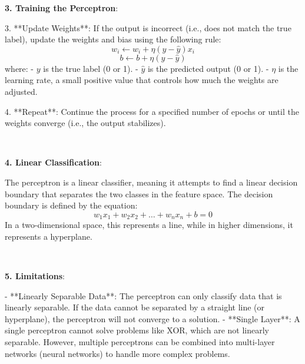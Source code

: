 \documentclass{article}
\newenvironment{cheatformula}[1][כותרת]{
    \begin{minipage}{\linewidth}
    \textbf{#1}:
}{
    \end{minipage}\\[2ex]
}
\begin{document}
\begin{multicols*}{2}
\begin{cheatformula}[3. Training the Perceptron]
3. **Update Weights**: If the output is incorrect (i.e., does not match the true label), update the weights and bias using the following rule:
   $$
   w_i \leftarrow w_i + \eta (y - \hat{y}) x_i
   $$
   $$
   b \leftarrow b + \eta (y - \hat{y})
   $$
   where:
   - $y$ is the true label (0 or 1).
   - $\hat{y}$ is the predicted output (0 or 1).
   - $\eta$ is the learning rate, a small positive value that controls how much the weights are adjusted.

4. **Repeat**: Continue the process for a specified number of epochs or until the weights converge (i.e., the output stabilizes).
\end{cheatformula}

\begin{cheatformula}[4. Linear Classification]
The perceptron is a linear classifier, meaning it attempts to find a linear decision boundary that separates the two classes in the feature space. The decision boundary is defined by the equation:
$$
w_1x_1 + w_2x_2 + \ldots + w_nx_n + b = 0
$$
In a two-dimensional space, this represents a line, while in higher dimensions, it represents a hyperplane.
\end{cheatformula}

\begin{cheatformula}[5. Limitations]

- **Linearly Separable Data**: The perceptron can only classify data that is linearly separable. If the data cannot be separated by a straight line (or hyperplane), the perceptron will not converge to a solution.
- **Single Layer**: A single perceptron cannot solve problems like XOR, which are not linearly separable. However, multiple perceptrons can be combined into multi-layer networks (neural networks) to handle more complex problems.
\end{cheatformula}



\end{multicols*}
\newpage
\end{document}
